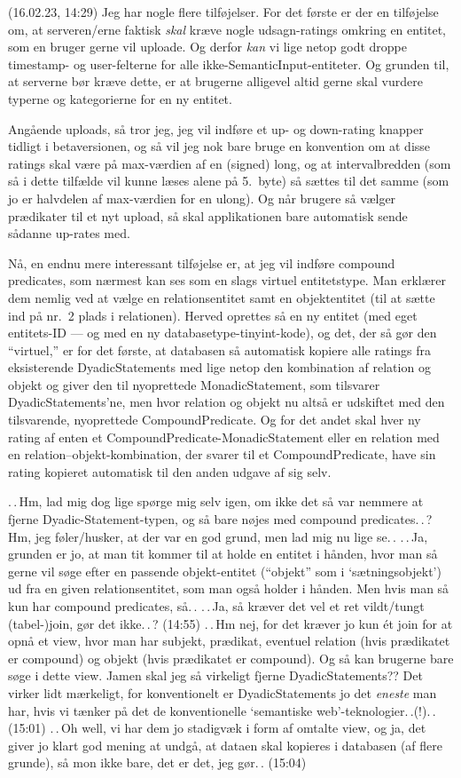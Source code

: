 \documentclass{report}
\begin{document}
(16.02.23, 14:29) Jeg har nogle flere tilføjelser. For det første er der en tilføjelse om, at serveren/erne faktisk \emph{skal} kræve nogle udsagn-ratings omkring en entitet, som en bruger gerne vil uploade. Og derfor \emph{kan} vi lige netop godt droppe timestamp- og user-felterne for alle ikke-SemanticInput-entiteter. Og grunden til, at serverne bør kræve dette, er at brugerne alligevel altid gerne skal vurdere typerne og kategorierne for en ny entitet. 

Angående uploads, så tror jeg, jeg vil indføre et up- og down-rating knapper tidligt i betaversionen, og så vil jeg nok bare bruge en konvention om at disse ratings skal være på max-værdien af en (signed) long, og at intervalbredden (som så i dette tilfælde vil kunne læses alene på 5.\ byte) så sættes til det samme (som jo er halvdelen af max-værdien for en ulong). Og når brugere så vælger prædikater til et nyt upload, så skal applikationen bare automatisk sende sådanne up-rates med. 

Nå, en endnu mere interessant tilføjelse er, at jeg vil indføre compound predicates, som nærmest kan ses som en slags virtuel entitetstype. Man erklærer dem nemlig ved at vælge en relationsentitet samt en objektentitet (til at sætte ind på nr.\ 2 plads i relationen). Herved oprettes så en ny entitet (med eget entitets-ID --- og med en ny databasetype-tinyint-kode), og det, der så gør den ``virtuel,'' er for det første, at databasen så automatisk kopiere alle ratings fra eksisterende DyadicStatements med lige netop den kombination af relation og objekt og giver den til nyoprettede MonadicStatement, som tilsvarer DyadicStatements'ne, men hvor relation og objekt nu altså er udskiftet med den tilsvarende, nyoprettede CompoundPredicate. Og for det andet skal hver ny rating af enten et CompoundPredicate-MonadicStatement eller en relation med en relation--objekt-kombination, der svarer til et CompoundPredicate, have sin rating kopieret automatisk til den anden udgave af sig selv. 

.\,.\,Hm, lad mig dog lige spørge mig selv igen, om ikke det så var nemmere at fjerne Dyadic-Statement-typen, og så bare nøjes med compound predicates.\,.\,? Hm, jeg føler/husker, at der var en god grund, men lad mig nu lige se.\,. .\,.\,Ja, grunden er jo, at man tit kommer til at holde en entitet i hånden, hvor man så gerne vil søge efter en passende objekt-entitet (``objekt'' som i `sætningsobjekt') ud fra en given relationsentitet, som man også holder i hånden. Men hvis man så kun har compound predicates, så.\,. .\,.\,Ja, så kræver det vel et ret vildt/tungt (tabel-)join, gør det ikke.\,.\,? (14:55) .\,.\,Hm nej, for det kræver jo kun ét join for at opnå et view, hvor man har subjekt, prædikat, eventuel relation (hvis prædikatet er compound) og objekt (hvis prædikatet er compound). Og så kan brugerne bare søge i dette view. Jamen skal jeg så virkeligt fjerne DyadicStatements?? Det virker lidt mærkeligt, for konventionelt er DyadicStatements jo det \emph{eneste} man har, hvis vi tænker på det de konventionelle `semantiske web'-teknologier.\,.(!).\,. (15:01) .\,.\,Oh well, vi har dem jo stadigvæk i form af omtalte view, og ja, det giver jo klart god mening at undgå, at dataen skal kopieres i databasen (af flere grunde), så mon ikke bare, det er det, jeg gør.\,. (15:04)
\end{document}
